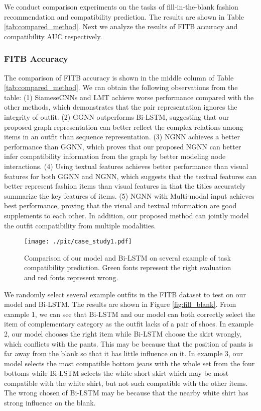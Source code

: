 \documentclass[sigconf]{acmart}
\begin{document}
We conduct comparison experiments on the tasks of fill-in-the-blank fashion recommendation and compatibility prediction. The results are shown in Table \ref{tab:compared_method}. Next we analyze the results of FITB accuracy and compatibility AUC respectively.

\subsubsection {FITB Accuracy} \label{sect:fitb}
The comparison of FITB accuracy is shown in the middle column of Table \ref{tab:compared_method}. We can obtain the following observations from the table:
(1) SiameseCNNs and LMT achieve worse performance compared with the other methods, which demonstrates that the pair representation ignores the integrity of outfit. (2) GGNN outperforms Bi-LSTM, suggesting that our proposed graph representation can better reflect the complex relations among items in an outfit than sequence representation. (3) NGNN achieves a better performance than GGNN, which proves that our proposed NGNN can better infer compatibility information from the graph by better modeling node interactions.
(4) Using textual features achieves better performance than visual features for both GGNN and NGNN, which suggests that the textual features can better represent fashion items than visual features in that the titles accurately summarize the key features of items.
(5) NGNN with Multi-modal input achieves best performance, proving that the visual and textual information are good supplements to each other. In addition, our proposed method can jointly model the outfit compatibility from multiple modalities.
\begin{figure}[t]
  \centering
\texttt{[image: ./pic/case\_study1.pdf]}
  \caption{Comparison of our model and Bi-LSTM on several example of task compatibility prediction. Green fonts represent the right evaluation and red fonts represent wrong.}
  \label{fig:case_study}
\end{figure}
We randomly select several example outfits in the FITB dataset to test on our model and Bi-LSTM. The results are shown in Figure \ref{fig:fill_blank}.
From example 1, we can see that Bi-LSTM and our model can both correctly select the item of complementary category as the outfit lacks of a pair of shoes. In example 2, our model chooses the right item while Bi-LSTM choose the skirt wrongly, which conflicts with the pants. This may be because that the position of pants is far away from the blank so that it has little influence on it. In example 3, our model selects the most compatible bottom jeans with the whole set from the four bottoms while Bi-LSTM selects the white short skirt which may be most compatible with the white shirt, but not such compatible with the other items. The wrong chosen of Bi-LSTM may be because that the nearby white shirt has strong influence on the blank.
\end{document}
